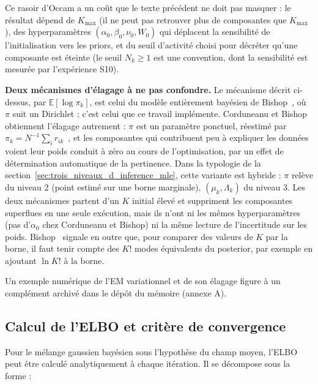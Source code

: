 Ce rasoir d'Occam a un coût que le texte précédent ne doit pas masquer : le résultat dépend de $K_{\max}$ (il ne peut pas retrouver plus de composantes que $K_{\max}$), des hyperparamètres $(\alpha_0, \beta_0, \nu_0, W_0)$ qui déplacent la sensibilité de l'initialisation vers les priors, et du seuil d'activité choisi pour décréter qu'une composante est éteinte (le seuil $N_k \geq 1$ est une convention, dont la sensibilité est mesurée par l'expérience S10).

\textbf{Deux mécanismes d'élagage à ne pas confondre. }Le mécanisme décrit ci-dessus, par $\mathbb{E}[\log \pi_k]$, est celui du modèle entièrement bayésien de Bishop~\cite[section~10.2]{bishop2006}, où $\pi$ suit un Dirichlet ; c'est celui que ce travail implémente. Corduneanu et Bishop~\cite{corduneanu2001} obtiennent l'élagage autrement : $\pi$ est un paramètre ponctuel, réestimé par $\pi_k = N^{-1}\sum_i r_{ik}$~\cite[éq.~10.83]{bishop2006}, et les composantes qui contribuent peu à expliquer les données voient leur poids conduit à zéro au cours de l'optimisation, par un effet de détermination automatique de la pertinence. Dans la typologie de la section~\ref{sec:trois_niveaux_d_inference_mle}, cette variante est hybride : $\pi$ relève du niveau 2 (point estimé sur une borne marginale), $(\mu_k, \Lambda_k)$ du niveau 3. Les deux mécanismes partent d'un $K$ initial élevé et suppriment les composantes superflues en une seule exécution, mais ils n'ont ni les mêmes hyperparamètres (pas d'$\alpha_0$ chez Corduneanu et Bishop) ni la même lecture de l'incertitude sur les poids. Bishop~\cite[section~10.2.4]{bishop2006} signale en outre que, pour comparer des valeurs de $K$ par la borne, il faut tenir compte des $K!$ modes équivalents du posterior, par exemple en ajoutant $\ln K!$ à la borne.

Un exemple numérique de l'EM variationnel et de son élagage figure à un complément archivé dans le dépôt du mémoire (annexe A).

\subsection{Calcul de l'ELBO et critère de convergence}\label{sec:calcul_elbo}
Pour le mélange gaussien bayésien sous l'hypothèse du champ moyen, l'ELBO peut être calculé analytiquement à chaque itération. Il se décompose sous la forme :

